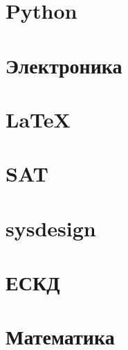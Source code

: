 \documentclass[oneside,12pt]{article}
\newcommand{\py}{Python}
\begin{document}
\section{\py}
\cite{pyotkidach,pythink}

\section{Электроника}
\cite{bcollis}

\section{\LaTeX}
\cite{ebooktex,bibiso,lvovsky}

\section{SAT} 
\cite{geektimes240554,VangliSAT}

\section{sysdesign}
\cite{proghant}

\section{ЕСКД}
\cite{
gost2701, gost2702, gost2703, gost2704, gost2705, gost2708, gost2709, gost2710,
gost2711, gost2721, gost2722, gost2723, gost2725, gost2726, gost2727, gost2728,
gost2829, gost2730, gost2731, gost2732, gost2733, gost2734, gost2735, gost2736,
gost2737, gost2741, gost2742, gost2743, gost2744, gost2745, gost2746, gost2747,
gost2751, gost2755, gost2756, gost2758, gost2759, gost2761, gost2762}

\section{Математика}

\cite{maxphis}

\printbibliography
\end{document}
